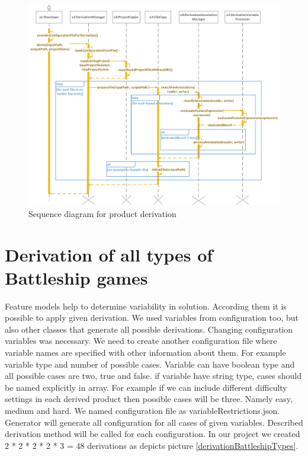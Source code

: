 \documentclass[11pt,slovak,a4paper,twoside]{article}
\begin{document}
\begin{figure}[!t]  %
					\begin{center}
									\includegraphics[width=\linewidth]{fig/derivationProcessTight.png}
									\caption{Sequence diagram for product derivation}
									\label{derivationProductSequenceDiagram}
					\end{center}
\end{figure}


\section{Derivation of all types of Battleship games} \label{allDerivations}

Feature models help to determine variability in solution. According them it is possible to apply given derivation. We used variables from configuration too, but also other classes that generate all possible derivations. Changing configuration variables was necessary. We need to create another configuration file where variable names are specified with other information about them. For example variable type and number of possible cases. Variable can have boolean type and all possible cases are two, true and false. if variable have string type, cases should be named explicitly in array. For example if we can include different difficulty settings in each derived product then possible cases will be three. Namely easy, medium and hard. We named configuration file as variableRestrictions.json. Generator will generate all configuration for all cases of given variables. Described derivation method will be called for each configuration. In our project we created 2 * 2 * 2 * 2 * 3 = 48 derivations as depicts picture \ref{derivationBattleshipTypes}.  
\end{document}
